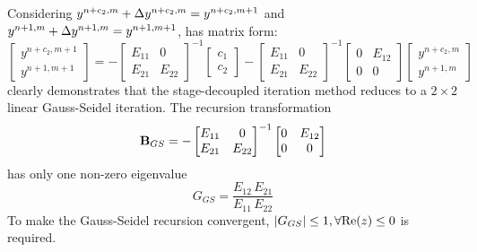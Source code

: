 \documentclass[preprint,12pt]{elsarticle}
\begin{document}
Considering $y^{n+c_2,m} + \mathrm\Delta y^{n+c_2,m} = y^{n+c_2,m+1}$ and
$y^{n+1,m} + \mathrm\Delta y^{n+1,m} = y^{n+1,m+1}$,
 has matrix form:
\begin{equation}
    \begin{bmatrix}
        y^{n+c_2, m + 1} \\
        y^{n+1, m + 1}
    \end{bmatrix}
    =
    -\begin{bmatrix}
        E_{11} & 0      \\
        E_{21} & E_{22}
    \end{bmatrix}^{-1} \begin{bmatrix}
        c_1 \\c_2
    \end{bmatrix}
    -
    \begin{bmatrix}
        E_{11} & 0      \\
        E_{21} & E_{22}
    \end{bmatrix}^{-1}
    \begin{bmatrix}
        0 & E_{12} \\
        0 & 0
    \end{bmatrix}
    \begin{bmatrix}
        y^{n+c_2, m} \\
        y^{n+1, m}
    \end{bmatrix}
    \label{eq:scalarGSMat}
\end{equation}
 clearly demonstrates that the stage-decoupled
iteration method reduces to a $2\times2$ linear Gauss-Seidel iteration.
The recursion transformation
\begin{equation}
    \mathbf{B}_{GS} = -\begin{bmatrix}
        E_{11} & 0      \\
        E_{21} & E_{22}
    \end{bmatrix}^{-1}
    \begin{bmatrix}
        0 & E_{12} \\
        0 & 0
    \end{bmatrix}
\end{equation}
has only one non-zero eigenvalue
\begin{equation}
    G_{GS} = \frac{E_{12}\,E_{21}}{E_{11}\,E_{22}}
\end{equation}
To make the Gauss-Seidel recursion 
convergent, $|G_{GS}|\leq 1, \forall \mathrm{Re}(z) \leq 0$ is required.
\end{document}
